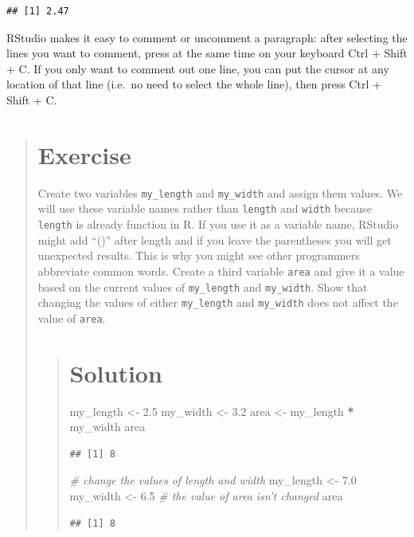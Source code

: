 \documentclass[]{book}
\newenvironment{Shaded}{\begin{snugshade}}{\end{snugshade}}
\newcommand{\FloatTok}[1]{\textcolor[rgb]{0.00,0.00,0.81}{#1}}
\newcommand{\StringTok}[1]{\textcolor[rgb]{0.31,0.60,0.02}{#1}}
\newcommand{\CommentTok}[1]{\textcolor[rgb]{0.56,0.35,0.01}{\textit{#1}}}
\newcommand{\OperatorTok}[1]{\textcolor[rgb]{0.81,0.36,0.00}{\textbf{#1}}}
\newcommand{\NormalTok}[1]{#1}
\begin{document}
\begin{verbatim}
## [1] 2.47
\end{verbatim}

RStudio makes it easy to comment or uncomment a paragraph: after
selecting the lines you want to comment, press at the same time on your
keyboard Ctrl + Shift + C. If you only want to comment out one line, you
can put the cursor at any location of that line (i.e.~no need to select
the whole line), then press Ctrl + Shift + C.

\begin{quote}
\section{Exercise}\label{exercise-2}

Create two variables \texttt{my\_length} and \texttt{my\_width} and
assign them values. We will use these variable names rather than
\texttt{length} and \texttt{width} because \texttt{length} is already
function in R. If you use it as a variable name, RStudio might add
``()'' after length and if you leave the parentheses you will get
unexpected results. This is why you might see other programmers
abbreviate common words. Create a third variable \texttt{area} and give
it a value based on the current values of \texttt{my\_length} and
\texttt{my\_width}. Show that changing the values of either
\texttt{my\_length} and \texttt{my\_width} does not affect the value of
\texttt{area}.

\begin{quote}
\section{Solution}\label{solution}

\begin{Shaded}
\begin{Highlighting}[]
\NormalTok{my_length <-}\StringTok{ }\FloatTok{2.5}
\NormalTok{my_width <-}\StringTok{ }\FloatTok{3.2}
\NormalTok{area <-}\StringTok{ }\NormalTok{my_length }\OperatorTok{*}\StringTok{ }\NormalTok{my_width}
\NormalTok{area}
\end{Highlighting}
\end{Shaded}

\begin{verbatim}
## [1] 8
\end{verbatim}

\begin{Shaded}
\begin{Highlighting}[]
\CommentTok{# change the values of length and width}
\NormalTok{my_length <-}\StringTok{ }\FloatTok{7.0}
\NormalTok{my_width <-}\StringTok{ }\FloatTok{6.5}
\CommentTok{# the value of area isn't changed}
\NormalTok{area}
\end{Highlighting}
\end{Shaded}

\begin{verbatim}
## [1] 8
\end{verbatim}
\end{quote}
\end{quote}
\end{document}
